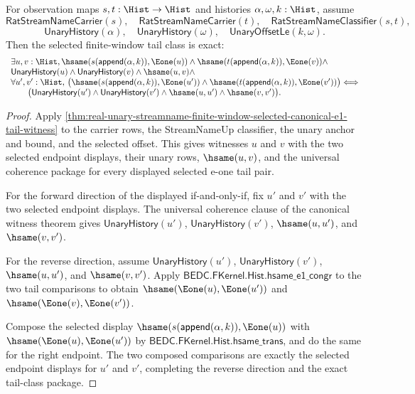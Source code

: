 \begin{theorem}
\label{thm:real-unary-streamname-finite-window-selected-tail-class-exactness}
For observation maps $s,t:\Hist\to\Hist$ and histories
$\alpha,\omega,k:\Hist$, assume
$$
\mathsf{RatStreamNameCarrier}(s),\quad
\mathsf{RatStreamNameCarrier}(t),\quad
\mathsf{RatStreamNameClassifier}(s,t),
$$
$$
\mathsf{UnaryHistory}(\alpha),\quad
\mathsf{UnaryHistory}(\omega),\quad
\mathsf{UnaryOffsetLe}(k,\omega).
$$
Then the selected finite-window tail class is exact:
$$
\begin{array}{l}
\exists u,v:\Hist,
\hsame(s(\mathsf{append}(\alpha,k)),\Eone(u))\land
\hsame(t(\mathsf{append}(\alpha,k)),\Eone(v))\land\\
\mathsf{UnaryHistory}(u)\land
\mathsf{UnaryHistory}(v)\land
\hsame(u,v)\land\\
\forall u',v':\Hist,\,
\bigl(\hsame(s(\mathsf{append}(\alpha,k)),\Eone(u'))\land
\hsame(t(\mathsf{append}(\alpha,k)),\Eone(v'))\bigr)
\Longleftrightarrow\\
\qquad
\bigl(\mathsf{UnaryHistory}(u')\land
\mathsf{UnaryHistory}(v')\land
\hsame(u,u')\land
\hsame(v,v')\bigr).
\end{array}
$$
\end{theorem}
\begin{proof}
Apply
\autoref{thm:real-unary-streamname-finite-window-selected-canonical-e1-tail-witness}
to the carrier rows, the StreamNameUp classifier, the unary anchor and bound,
and the selected offset. This gives witnesses $u$ and $v$ with the two selected
endpoint displays, their unary rows, $\hsame(u,v)$, and the universal coherence
package for every displayed selected e-one tail pair.

For the forward direction of the displayed if-and-only-if, fix $u'$ and $v'$
with the two selected endpoint displays. The universal coherence clause of the
canonical witness theorem gives $\mathsf{UnaryHistory}(u')$,
$\mathsf{UnaryHistory}(v')$, $\hsame(u,u')$, and $\hsame(v,v')$.

For the reverse direction, assume $\mathsf{UnaryHistory}(u')$,
$\mathsf{UnaryHistory}(v')$, $\hsame(u,u')$, and $\hsame(v,v')$. Apply
$\mathsf{BEDC.FKernel.Hist.hsame\_e1\_congr}$ to the two tail comparisons to
obtain $\hsame(\Eone(u),\Eone(u'))$ and
$\hsame(\Eone(v),\Eone(v'))$.

Compose the selected display
$\hsame(s(\mathsf{append}(\alpha,k)),\Eone(u))$ with
$\hsame(\Eone(u),\Eone(u'))$ by
$\mathsf{BEDC.FKernel.Hist.hsame\_trans}$, and do the same for the right
endpoint. The two composed comparisons are exactly the selected endpoint
displays for $u'$ and $v'$, completing the reverse direction and the exact
tail-class package.
\end{proof}

